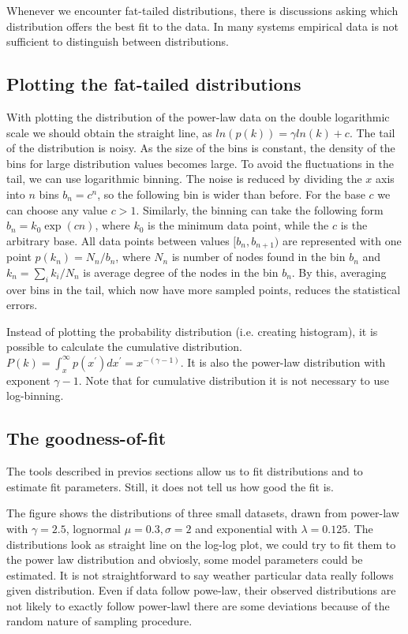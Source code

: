 Whenever we encounter fat-tailed distributions, there is discussions asking which distribution offers the best fit to the data. In many systems empirical data is not sufficient to distinguish between distributions. 

\subsection{Plotting the fat-tailed distributions}

With plotting the distribution of the power-law data on the double logarithmic scale we should obtain the straight line, as $ln(p(k)) = \gamma ln(k) + c$. The tail of the distribution is noisy. As the size of the bins is constant, the density of the bins for large distribution values becomes large. To avoid the fluctuations in the tail, we can use logarithmic binning. The noise is reduced by dividing the $x$ axis into $n$ bins $b_n = c^n$, so the following bin is wider than before. For the base $c$ we can choose any value $c>1$. Similarly, the binning can take the following form $b_n = k_0\exp{(cn)}$, where $k_0$ is the minimum data point, while the $c$ is the arbitrary base. All data points between values $[b_n, b_{n+1})$ are represented with one point $p(k_n) = N_n/b_n$, where $N_n$ is number of nodes found in the bin $b_n$ and $k_n = \sum_i k_i / N_n$ is average degree of the nodes in the bin $b_n$. By this, averaging over bins in the tail, which now have more sampled points, reduces the statistical errors.

Instead of plotting the probability distribution (i.e. creating histogram), it is possible to calculate the cumulative distribution. $P(k) = \int_{x}^{\infty} p(x^{'}) dx^{'} = x^{-(\gamma-1)}$. It is also the power-law distribution with exponent $\gamma-1$. Note that for cumulative distribution it is not necessary to use log-binning. 


\subsection{The goodness-of-fit}

The tools described in previos sections allow us to fit distributions and to estimate fit parameters. Still, it does not tell us how good the fit is. 

The figure shows the distributions of three small datasets, drawn from power-law with $\gamma=2.5$, lognormal $\mu=0.3, \sigma=2$ and exponential with $\lambda=0.125$. The distributions look as straight line on the log-log plot, we could try to fit them to the power law distribution and obviosly, some model parameters could be estimated. It is not straightforward to say weather particular data really follows given distribution. Even if data follow powe-law, their observed distributions are not likely to exactly follow power-lawl there are some deviations because of the random nature of sampling procedure. 

